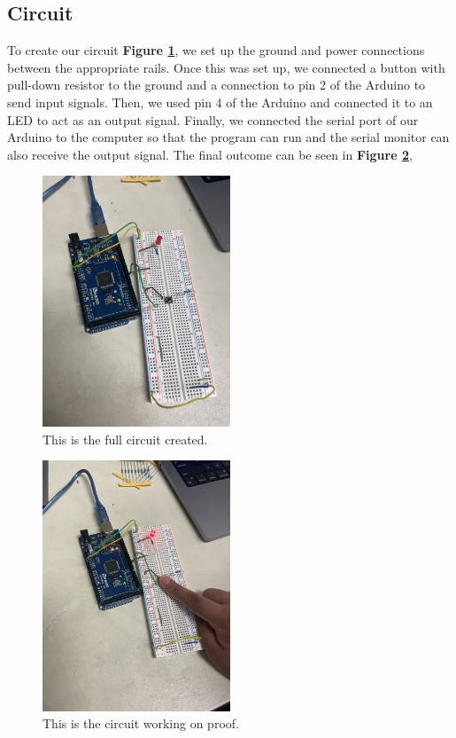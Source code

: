 \documentclass{article}
\begin{document}
\subsection{Circuit}

To create our circuit \textbf{Figure \ref{fig:circuit-off}}, we set up the ground and power connections between the appropriate rails. Once this was set up, we connected a button with pull-down resistor to the ground and a connection to pin 2 of the Arduino to send input signals. Then, we used pin 4 of the Arduino and connected it to an LED to act as an output signal. Finally, we connected the serial port of our Arduino to the computer so that the program can run and the serial monitor can also receive the output signal. The final outcome can be seen in \textbf{Figure \ref{fig:circuit-on}}, 

\begin{figure}
\centering
\includegraphics[width=0.5\textwidth]{circuit-off.jpg}
\caption{\label{fig:circuit-off}This is the full circuit created.}
\end{figure}

\begin{figure}
\centering
\includegraphics[width=0.5\textwidth]{circuit-on.jpg}
\caption{\label{fig:circuit-on}This is the circuit working on proof.}
\end{figure}
\end{document}
